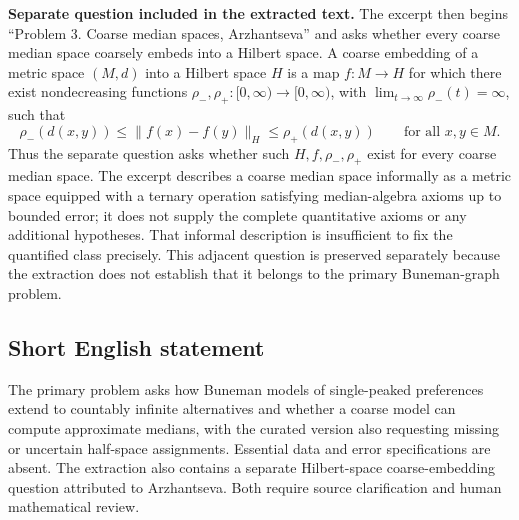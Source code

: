 \documentclass[11pt]{article}
\begin{document}
\textbf{Separate question included in the extracted text.} The excerpt then begins ``Problem 3. Coarse median spaces, Arzhantseva'' and asks whether every coarse median space coarsely embeds into a Hilbert space. A coarse embedding of a metric space \((M,d)\) into a Hilbert space \(H\) is a map \(f:M\to H\) for which there exist nondecreasing functions \(\rho_-,\rho_+:[0,\infty)\to[0,\infty)\), with \(\lim_{t\to\infty}\rho_-(t)=\infty\), such that
\[
\rho_-(d(x,y))\leq \|f(x)-f(y)\|_H\leq \rho_+(d(x,y))
\qquad\text{for all }x,y\in M.
\]
Thus the separate question asks whether such \(H,f,\rho_-,\rho_+\) exist for every coarse median space. The excerpt describes a coarse median space informally as a metric space equipped with a ternary operation satisfying median-algebra axioms up to bounded error; it does not supply the complete quantitative axioms or any additional hypotheses. That informal description is insufficient to fix the quantified class precisely. This adjacent question is preserved separately because the extraction does not establish that it belongs to the primary Buneman-graph problem.
\subsection{Short English statement}
The primary problem asks how Buneman models of single-peaked preferences extend to countably infinite alternatives and whether a coarse model can compute approximate medians, with the curated version also requesting missing or uncertain half-space assignments. Essential data and error specifications are absent. The extraction also contains a separate Hilbert-space coarse-embedding question attributed to Arzhantseva. Both require source clarification and human mathematical review.
\end{document}

